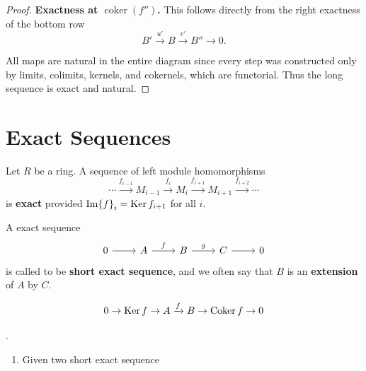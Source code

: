 \documentclass[12pt, oneside]{book}
\begin{document}
\begin{lemma}
\begin{proof}
        \smallskip
        \noindent\textbf{Exactness at $\operatorname{coker}(f'')$.}
        This follows directly from the right exactness of the bottom row
        \[
            B' \xrightarrow{u'} B \xrightarrow{v'} B'' \to 0.
        \]

        \smallskip

        All maps are natural in the entire diagram since every step was constructed only
        by limits, colimits, kernels, and cokernels, which are functorial.
        Thus the long sequence is exact and natural.
    \end{proof}
\end{lemma}




\section{Exact Sequences} %
\begin{definition}
    Let $R$ be a ring.
    A sequence of left module homomorphisms
    \begin{equation*}
        \cdots \xrightarrow{f_{i-1}} M_{i-1} \xrightarrow{f_i} M_i \xrightarrow{f_{i+1}} M_{i+1} \xrightarrow{f_{i+2}} \cdots
    \end{equation*}
    is \textbf{exact} provided $\Im {f}_i=\operatorname{\operatorname{Ker}} {f}_{{i}+1}$ for all $i$.
\end{definition}

\begin{definition}
    A exact sequence
    \begin{equation*}
        \begin{tikzcd}
            0 \arrow[r,""]&A \arrow[r,"f"]&B \arrow[r,"g"]&C\arrow[r,""]&0
        \end{tikzcd}
    \end{equation*}
    is called to be \textbf{short exact sequence}, and we often say that $B$ is an \textbf{extension} of $A$ by $C$.
    \begin{remark}
        \begin{equation*}
            0 \rightarrow \operatorname{\operatorname{Ker}} f \rightarrow A \xrightarrow{f} B \rightarrow \operatorname{\operatorname{Coker}} f \rightarrow 0
        \end{equation*}
    \end{remark}
\end{definition}



\begin{proposition}.
    \begin{enumerate}
        \item Given two short exact sequence
    \end{enumerate}
\end{proposition}
\end{document}
